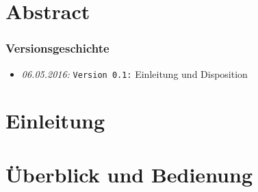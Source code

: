 \documentclass{fhnwreport/fhnwreport}
\begin{document}


\clearpage
{


    \section{Abstract}
    \label{sec:abstract}
    


    \clearpage
    \tableofcontents


    \vspace{10mm}
    \subsubsection*{Versionsgeschichte}
    \begin{itemize}
        \item[]
            \emph{06.05.2016:} \texttt{Version 0.1:} Einleitung und Disposition
    \end{itemize}



}


\pagestyle{headings}

\clearpage
\section{Einleitung}
\label{sec:einleitung}



\clearpage
\section{\"Uberblick und Bedienung}
\label{sec:uberblick}

\end{document}
